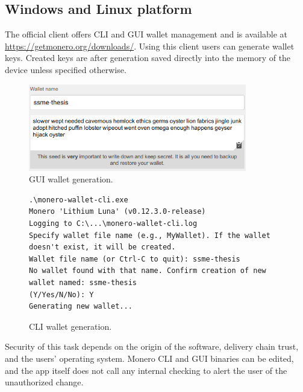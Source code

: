 \documentclass[
  printed, %
  table,   %
  lof,     %
  lot,     %
           oneside, color
]{fithesis3}
\begin{document}
\subsection{Windows and Linux platform}
The official client offers CLI and GUI wallet management and is available at \url{https://getmonero.org/downloads/}. Using this client users can generate wallet keys. Created keys are after generation saved directly into the memory of the device unless specified otherwise. 
\begin{figure}[H]
\begin{center}
 \includegraphics[trim={0 0 0 0},clip,width=0.85\textwidth]{Screenshot_4.png}
    \caption{GUI wallet generation.}
    \label{pic:guigenerator}
\end{center}
    \end{figure}

\begin{figure}[H]
\begin{center}
\begin{lstlisting}
.\monero-wallet-cli.exe
Monero 'Lithium Luna' (v0.12.3.0-release)
Logging to C:\...\monero-wallet-cli.log
Specify wallet file name (e.g., MyWallet). If the wallet 
doesn't exist, it will be created.
Wallet file name (or Ctrl-C to quit): ssme-thesis
No wallet found with that name. Confirm creation of new 
wallet named: ssme-thesis
(Y/Yes/N/No): Y
Generating new wallet...
\end{lstlisting}
\caption{CLI wallet generation.}
    \label{pic:cligenerator}
\end{center}
    \end{figure}
Security of this task depends on the origin of the software, delivery chain trust, and the users' operating system. Monero CLI and GUI binaries can be edited, and the app itself does not call any internal checking to alert the user of the unauthorized change. 
\end{document}
